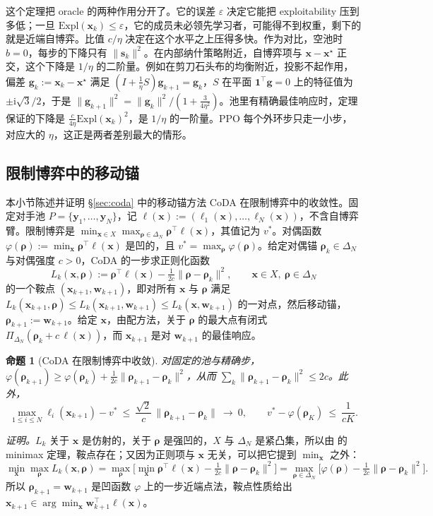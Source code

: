\documentclass{article}
\theoremstyle{plain}
\newtheorem{proposition}[theorem]{命题}
\theoremstyle{remark}
\newcommand{\Expl}{\mathrm{Expl}}
\newcommand{\Proj}{\Pi}
\newcommand{\simplex}{\Delta}
\newcommand{\bx}{{\bm{x}}}
\newcommand{\by}{{\bm{y}}}
\newcommand{\bw}{{\bm{w}}}
\newcommand{\bg}{{\bm{g}}}
\newcommand{\brho}{{\bm{\rho}}}
\newcommand{\bell}{{\bm{\ell}}}
\newcommand{\xs}{\bx^{\star}}
\newcommand{\dx}{{\bm{s}}}
\newcommand{\coda}{CoDA}
\begin{document}
这个定理把 oracle 的两种作用分开了。它的误差 $\varepsilon$ 决定它能把 exploitability 压到多低；一旦 $\Expl(\bx_k)\le\varepsilon$，它的成员未必领先学习者，可能得不到权重，剩下的就是近端自博弈。比值 $c/\eta$ 决定在这个水平之上压得多快。作为对比，空池时 $b=0$，每步的下降只有 $\|\dx_k\|^2$。在内部纳什策略附近，自博弈项与 $\bx-\xs$ 正交，这个下降是 $1/\eta$ 的二阶量。例如在剪刀石头布的均衡附近，投影不起作用，偏差 $\bg_k:=\bx_k-\xs$ 满足 $(I+\tfrac1\eta S)\bg_{k+1}=\bg_k$，$S$ 在平面 $\mathbf 1^\top\bg=0$ 上的特征值为 $\pm\mathrm i\sqrt3/2$，于是 $\|\bg_{k+1}\|^2=\|\bg_k\|^2/(1+\tfrac{3}{4\eta^2})$。池里有精确最佳响应时，定理保证的下降是 $\tfrac{c}{4\eta}\Expl(\bx_k)^2$，是 $1/\eta$ 的一阶量。PPO 每个外环步只走一小步，对应大的 $\eta$，这正是两者差别最大的情形。

\subsection{限制博弈中的移动锚}
\label{app:coda}

本小节陈述并证明 \S\ref{sec:coda} 中的移动锚方法 \coda{} 在限制博弈中的收敛性。固定对手池 $P=\{\by_1,\dots,\by_N\}$，记 $\bell(\bx):=(\ell_1(\bx),\dots,\ell_N(\bx))$，不含自博弈臂。限制博弈是 $\min_{\bx\in X}\max_{\brho\in\simplex_N}\brho^\top\bell(\bx)$，其值记为 $v^*$。对偶函数 $\varphi(\brho):=\min_\bx\brho^\top\bell(\bx)$ 是凹的，且 $v^*=\max_\brho\varphi(\brho)$。给定对偶锚 $\brho_k\in\simplex_N$ 与对偶强度 $c>0$，\coda{} 的一步求正则化函数
\begin{equation}
L_k(\bx,\brho):=\brho^\top\bell(\bx)-\tfrac1{2c}\|\brho-\brho_k\|^2 ,\qquad \bx\in X,\ \brho\in\simplex_N
\label{eq:coda}
\end{equation}
的一个鞍点 $(\bx_{k+1},\bw_{k+1})$，即对所有 $\bx$ 与 $\brho$ 满足 $L_k(\bx_{k+1},\brho)\le L_k(\bx_{k+1},\bw_{k+1})\le L_k(\bx,\bw_{k+1})$ 的一对点，然后移动锚，$\brho_{k+1}:=\bw_{k+1}$。给定 $\bx$，由配方法，关于 $\brho$ 的最大点有闭式 $\Proj_{\simplex_N}(\brho_k+c\,\bell(\bx))$，而 $\bx_{k+1}$ 是对 $\bw_{k+1}$ 的最佳响应。

\begin{proposition}[\coda{} 在限制博弈中收敛]
\label{prop:coda}
对固定的池与精确步，$\varphi(\brho_{k+1})\ge\varphi(\brho_k)+\tfrac1{2c}\|\brho_{k+1}-\brho_k\|^2$，从而 $\sum_k\|\brho_{k+1}-\brho_k\|^2\le2c$。此外，
\[
\max_{1\le i\le N}\ell_i(\bx_{k+1})-v^*\ \le\ \frac{\sqrt2}{c}\,\|\brho_{k+1}-\brho_k\|\ \longrightarrow\ 0 ,\qquad v^*-\varphi(\brho_K)\ \le\ \frac{1}{cK} .
\]
\end{proposition}
\textit{证明。}$L_k$ 关于 $\bx$ 是仿射的，关于 $\brho$ 是强凹的，$X$ 与 $\simplex_N$ 是紧凸集，所以由 \citet{sion1958} 的 minimax 定理，鞍点存在；又因为正则项与 $\bx$ 无关，可以把它提到 $\min_\bx$ 之外：
\[
\min_{\bx}\max_{\brho}L_k(\bx,\brho)=\max_{\brho}\Big[\min_\bx\brho^\top\bell(\bx)-\tfrac1{2c}\|\brho-\brho_k\|^2\Big]=\max_{\brho\in\simplex_N}\Big[\varphi(\brho)-\tfrac1{2c}\|\brho-\brho_k\|^2\Big].
\]
所以 $\brho_{k+1}=\bw_{k+1}$ 是凹函数 $\varphi$ 上的一步近端点法，鞍点性质给出 $\bx_{k+1}\in\arg\min_\bx\bw_{k+1}^\top\bell(\bx)$。
\end{document}
